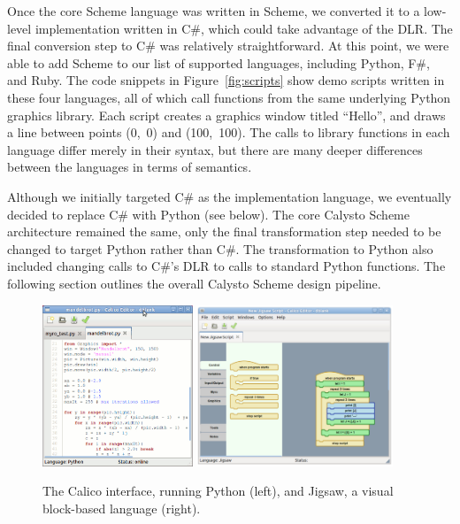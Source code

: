 \documentclass[acmsmall,screen,authorversion]{acmart}
\begin{document}
Once the core Scheme language was written in Scheme, we converted it to a
low-level implementation written in C\#, which could take advantage of the
DLR. The final conversion step to C\# was relatively straightforward. At this
point, we were able to add Scheme to our list of supported languages, including
Python, F\#, and Ruby.  The code snippets in Figure~\ref{fig:scripts} show demo
scripts written in these four languages, all of which call functions from the
same underlying Python graphics library. Each script creates a graphics window
titled ``Hello'', and draws a line between points (0,~0) and (100,~100). The
calls to library functions in each language differ merely in their syntax, but
there are many deeper differences between the languages in terms of semantics.

Although we initially targeted C\# as the implementation language, we
eventually decided to replace C\# with Python (see below). The core Calysto
Scheme architecture remained the same, only the final transformation step
needed to be changed to target Python rather than C\#. The transformation to
Python also included changing calls to C\#'s DLR to calls to standard Python
functions. The following section outlines the overall Calysto Scheme design
pipeline.


\begin{figure}
  \centering
  \includegraphics[width=0.40\textwidth]{calico-interface-python.jpg}
  \hspace{0.15in}
  \includegraphics[width=0.523\textwidth]{calico-interface-jigsaw.jpg}
  \caption{The Calico interface, running Python (left),
    and Jigsaw, a visual block-based language (right).}
  \label{fig:calico}
\end{figure}
\end{document}
